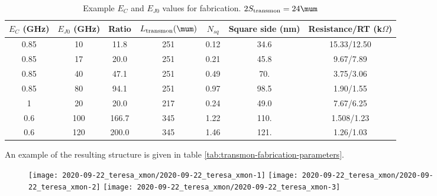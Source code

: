  \begin{table}[h]
   \centering
   \caption{Example           $E_C$          and           $E_{J0}$           values          for           fabrication.
     $2S_{\text{transmon}}=24\mum$ \label{tab:transmon-fabrication-parameters}}
   \begin{tabular}{|c|c|c|c|c|c|c|}
     \hline
     $E_{C}$ (GHz) & $E_{J0}$ (GHz) & Ratio &  $L_{\text{transmon}} (\mum)$ & $N_{sq}$ & Square side (nm) & Resistance/RT (k$\Omega$)\\\hline
     0.85 &               10 &    11.8 &              251 &                  0.12 &              34.6 &                    15.33/12.50  \\
     0.85 &               17 &    20.0 &              251 &                  0.21 &              45.8 &                    9.67/7.89  \\
     0.85 &               40 &    47.1 &              251 &                  0.49 &               70. &                    3.75/3.06     \\
     0.85 &               80 &    94.1 &              251 &                  0.97 &              98.5 &                    1.90/1.55  \\
     1 &               20 &    20.0 &              217 &                  0.24 &              49.0 &                    7.67/6.25  \\
     0.6 &              100 &   166.7 &              345 &                  1.22 &              110. &                    1.508/1.23 \\
     0.6 &              120 &   200.0 &              345 &                  1.46 &              121. &                    1.26/1.03 \\\hline
   \end{tabular}
 \end{table}

 \noindent An example of the resulting structure is given in table \autoref{tab:transmon-fabrication-parameters}.

 \begin{figure}[h]
   \centering                     \texttt{[image: 2020-09-22\_teresa\_xmon/2020-09-22\_teresa\_xmon-1]}
   \texttt{[image: 2020-09-22\_teresa\_xmon/2020-09-22\_teresa\_xmon-2]}
   \texttt{[image: 2020-09-22\_teresa\_xmon/2020-09-22\_teresa\_xmon-3]}
 \end{figure}

 \noindent


